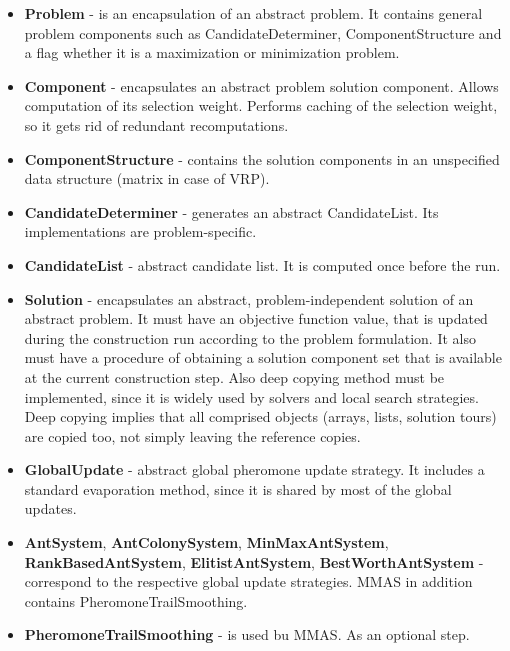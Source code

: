 \documentclass[12pt,a4paper,oneside]{book}
\begin{document}
\begin{itemize}
\item \textbf{Problem} - is an encapsulation of an abstract problem. It contains general problem components such as CandidateDeterminer, ComponentStructure and a flag whether it is a maximization or minimization problem.

\item \textbf{Component} - encapsulates an abstract problem solution component. Allows computation of its selection weight. Performs caching of the selection weight, so it gets rid of redundant recomputations.

\item \textbf{ComponentStructure} - contains the solution components in an unspecified data structure (matrix in case of VRP).

\item \textbf{CandidateDeterminer} - generates an abstract CandidateList. Its implementations are problem-specific.

\item \textbf{CandidateList} - abstract candidate list. It is computed once before the run.

\item \textbf{Solution} - encapsulates an abstract, problem-independent solution of an abstract problem. It must have an objective function value, that is updated during the construction run according to the problem formulation. It also must have a procedure of obtaining a solution component set that is available at the current construction step. Also deep copying method must be implemented, since it is widely used by solvers and local search strategies. Deep copying implies that all comprised objects (arrays, lists, solution tours) are copied too, not simply leaving the reference copies.

\item \textbf{GlobalUpdate} - abstract global pheromone update strategy. It includes a standard evaporation method, since it is shared by most of the global updates.

\item \textbf{AntSystem}, \textbf{AntColonySystem}, \textbf{MinMaxAntSystem}, \textbf{RankBasedAntSystem}, \textbf{ElitistAntSystem}, \textbf{BestWorthAntSystem} - correspond to the respective global update strategies. MMAS in addition contains PheromoneTrailSmoothing.

\item \textbf{PheromoneTrailSmoothing} - is used bu MMAS. As an optional step.


\end{itemize}
\end{document}
